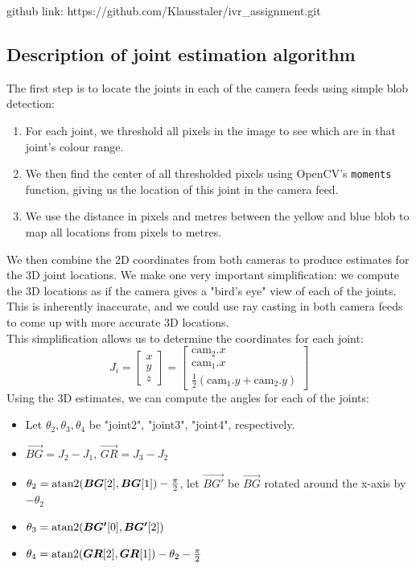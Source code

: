 
github link: https://github.com/Klausstaler/ivr\_assignment.git


\subsection{Description of joint estimation algorithm} \label{joint_algo}
The first step is to locate the joints in each of the camera feeds using
simple blob detection:
\begin{enumerate}
    \item
        For each joint, we threshold all pixels in the image to see
        which are in that joint's colour range.
    \item
        We then find the center of all thresholded pixels using
        OpenCV's \texttt{moments} function, giving us the location
        of this joint in the camera feed.
    \item
        We use the distance in pixels and metres between the yellow
        and blue blob to map all locations from pixels to metres.
\end{enumerate}
We then combine the 2D coordinates from both cameras to produce
estimates for the 3D joint locations. We make one very important
simplification: we compute the 3D locations as if the camera
gives a "bird's eye" view of each of the joints.
This is inherently inaccurate, and we could use ray casting in both camera feeds
to come up with more accurate 3D locations.\\
This simplification allows us to determine the coordinates for each joint:
\[ 
    J_i = \begin{bmatrix} x \\ y \\ z \end{bmatrix} =
    \begin{bmatrix} 
        \text{cam}_2.x \\
        \text{cam}_1.x \\
        \frac{1}{2} (\text{cam}_1.y + \text{cam}_2.y)
    \end{bmatrix} 
\]
Using the 3D estimates, we can compute the angles for each of the joints:
\begin{itemize}
    \item
        Let $\theta_2, \theta_3, \theta_4$ be
        "joint2", "joint3", "joint4", respectively.
    \item $\vec{BG} = J_2 - J_1$, $\vec{GR} = J_3 - J_2$
    \item $\theta_2 = \operatorname{atan2}(\bm{BG}[2], \bm{BG}[1]) - \frac{\pi}{2}$,
        let $\vec{BG'}$ be $\vec{BG}$ rotated around the x-axis by $-\theta_2$
    \item $\theta_3 = \operatorname{atan2}(\bm{BG'}[0], \bm{BG'}[2])$
    \item $\theta_4 = \operatorname{atan2}(\bm{GR}[2],\bm{GR}[1]) - \theta_2 - \frac{\pi}{2}$
\end{itemize}

